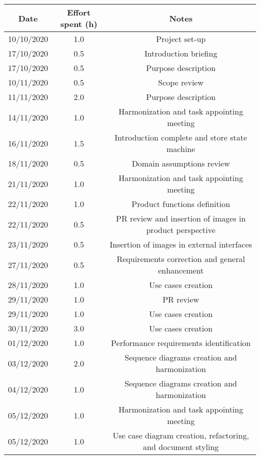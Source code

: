 \documentclass[../../main.tex]{subfiles}
\begin{document}
    \begin{center}
        \begin{tabular}{|c| |c| |c|} 
            \hline
            Date & Effort spent (h) & Notes\\ [0.5ex] 
            \hline\hline
            10/10/2020 & 1.0 & Project set-up\\ 
            17/10/2020 & 0.5 & Introduction briefing\\ 
            17/10/2020 & 0.5 & Purpose description\\ 
            10/11/2020 & 0.5 & Scope review\\
            11/11/2020 & 2.0 & Purpose description\\
            14/11/2020 & 1.0 & Harmonization and task appointing meeting\\
            16/11/2020 & 1.5 & Introduction complete and store state machine\\
            18/11/2020 & 0.5 & Domain assumptions review\\
            21/11/2020 & 1.0 & Harmonization and task appointing meeting\\
            22/11/2020 & 1.0 & Product functions definition\\
            22/11/2020 & 0.5 & PR review and insertion of images in product perspective\\
            23/11/2020 & 0.5 & Insertion of images in external interfaces\\
            27/11/2020 & 0.5 & Requirements correction and general enhancement\\
            28/11/2020 & 1.0 & Use cases creation\\
            29/11/2020 & 1.0 & PR review\\
            29/11/2020 & 1.0 & Use cases creation\\
            30/11/2020 & 3.0 & Use cases creation\\
            01/12/2020 & 1.0 & Performance requirements identification\\
            03/12/2020 & 2.0 & Sequence diagrams creation and harmonization\\
            04/12/2020 & 1.0 & Sequence diagrams creation and harmonization\\
            05/12/2020 & 1.0 & Harmonization and task appointing meeting\\
            05/12/2020 & 1.0 & Use case diagram creation, refactoring, and document styling\\
            \hline
        \end{tabular}
    \end{center}
\end{document}
